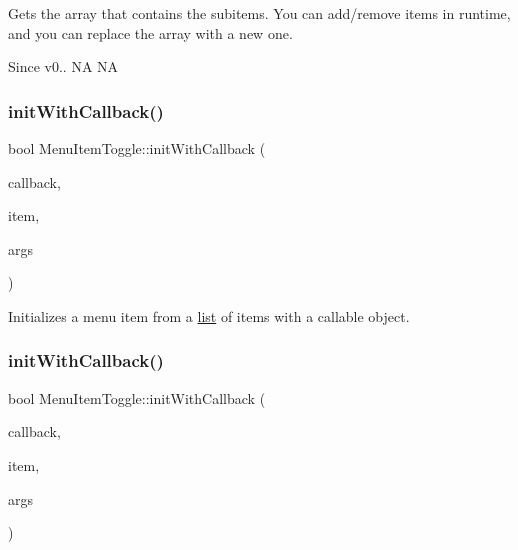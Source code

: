 Gets the array that contains the subitems. You can add/remove items in runtime, and you can replace the array with a new one. \begin{DoxySince}{Since}
v0..  NA  NA 
\end{DoxySince}
\mbox{\label{classMenuItemToggle_abaea61af06e607b5bafe8a12d4a7e743}} 
\subsubsection{\texorpdfstring{init\+With\+Callback()}{initWithCallback()}\hspace{0.1cm}{\footnotesize\ttfamily [1/2]}}
{\footnotesize\ttfamily bool Menu\+Item\+Toggle\+::init\+With\+Callback (\begin{DoxyParamCaption}\item[{const cc\+Menu\+Callback \&}]{callback,  }\item[{\hyperlink{classMenuItem}{Menu\+Item} $\ast$}]{item,  }\item[{va\+\_\+list}]{args }\end{DoxyParamCaption})}

Initializes a menu item from a \hyperlink{protocollist-p}{list} of items with a callable object. \mbox{\label{classMenuItemToggle_abaea61af06e607b5bafe8a12d4a7e743}} 
\subsubsection{\texorpdfstring{init\+With\+Callback()}{initWithCallback()}\hspace{0.1cm}{\footnotesize\ttfamily [2/2]}}
{\footnotesize\ttfamily bool Menu\+Item\+Toggle\+::init\+With\+Callback (\begin{DoxyParamCaption}\item[{const cc\+Menu\+Callback \&}]{callback,  }\item[{\hyperlink{classMenuItem}{Menu\+Item} $\ast$}]{item,  }\item[{va\+\_\+list}]{args }\end{DoxyParamCaption})}

